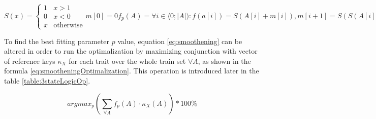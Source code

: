 \begin{subequations}
\begin{equation}
S(x) =\begin{cases} 1 & x > 1           \\
                    0 & x < 0           \\
                    x & \text{otherwise}
      \end{cases}
\end{equation}
\begin{equation}
m[0] = 0
\end{equation}
\begin{equation}
f_{p}(A) = \forall i \in \langle 0;|A|):  f(a[i]) = S(A[i] + m[i]), m[i+1] = S(S(A[i] + m[i]) + |A[i]|*p)
\end{equation}
\label{eq:smoothening}
\end{subequations}

To find the best fitting parameter $p$ value, equation \ref{eq:smoothening} can be
altered in order to run the optimalization by maximizing conjunction with vector of
reference keys $\kappa_{X}$ for each trait over the whole train set $\forall A$,
as shown in the formula \ref{eq:smootheningOptimalization}.
This operation is introduced later in the table \ref{table:3stateLogicOp}.

\begin{equation}
argmax_{p} (\sum_{\forall A} f_{p}(A)\cdot \kappa_{X}(A) )* 100\%
\label{eq:smootheningOptimalization}
\end{equation}






